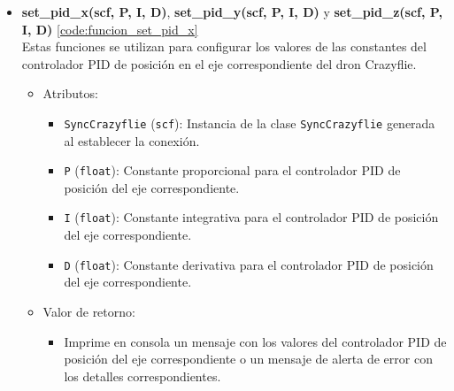 \begin{itemize}
	\item \textbf{set\_pid\_x(scf, P, I, D)}, \textbf{set\_pid\_y(scf, P, I, D)} y \textbf{set\_pid\_z(scf, P, I, D)} \ref{code:funcion_set_pid_x} \\
	Estas funciones se utilizan para configurar los valores de las constantes del controlador PID de posición en el eje correspondiente del dron Crazyflie.
	\begin{itemize}
		\item Atributos:
		\begin{itemize}
			\item \texttt{SyncCrazyflie} (\texttt{scf}): Instancia de la clase \texttt{SyncCrazyflie} generada al establecer la conexión.
			\item \texttt{P} (\texttt{float}): Constante proporcional para el controlador PID de posición del eje correspondiente.
			\item \texttt{I} (\texttt{float}): Constante integrativa para el controlador PID de posición del eje correspondiente.
			\item \texttt{D} (\texttt{float}): Constante derivativa para el controlador PID de posición del eje correspondiente.
		\end{itemize}
		\item Valor de retorno:
		\begin{itemize}
			\item Imprime en consola un mensaje con los valores del controlador PID de posición del eje correspondiente o un mensaje de alerta de error con los detalles correspondientes.
		\end{itemize}
	\end{itemize} 
\end{itemize}

